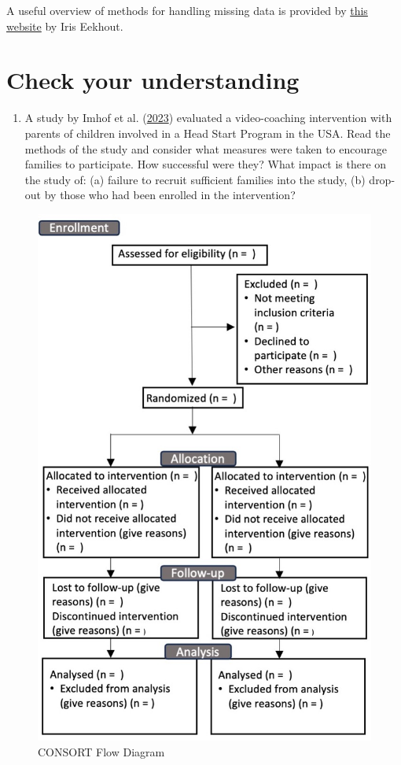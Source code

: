 \documentclass{krantz}
\providecommand{\tightlist}{%
\setlength{\itemsep}{0pt}\setlength{\parskip}{0pt}}
\begin{document}
A useful overview of methods for handling missing data is provided by \href{https://www.missingdata.nl/}{this website} by Iris Eekhout.

\hypertarget{check-your-understanding-8}{%
\section{Check your understanding}\label{check-your-understanding-8}}

\begin{enumerate}
\def\labelenumi{\arabic{enumi}.}
\tightlist
\item
  A study by Imhof et al. (\protect\hyperlink{ref-imhof2023}{2023}) evaluated a video-coaching intervention with parents of children involved in a Head Start Program in the USA. Read the methods of the study and consider what measures were taken to encourage families to participate. How successful were they? What impact is there on the study of: (a) failure to recruit sufficient families into the study, (b) drop-out by those who had been enrolled in the intervention?
\end{enumerate}

\begin{figure}
\includegraphics[width=0.9\linewidth]{images_bw/consort} \caption{CONSORT Flow Diagram}\label{fig:consortfig}
\end{figure}
\end{document}
